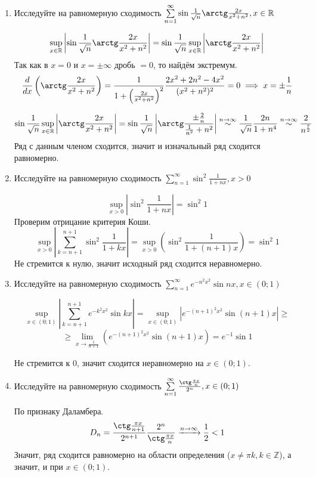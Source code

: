 \documentclass{article}
\begin{document}
\begin{large}
\begin{enumerate}
\item Исследуйте на равномерную сходимость $ \sum\limits_{n=1}^{\infty} \sin \frac{1}{\sqrt{n}} \arctg \frac{2x}{x^2 + n^2}, x \in \mathbb{R} $

$$ \sup_{x \in \mathbb{R}} \left| \sin \frac{1}{\sqrt{n}} \arctg \frac{2x}{x^2 + n^2} \right| = \sin \frac{1}{\sqrt{n}} \sup_{x \in \mathbb{R}} \left| \arctg \frac{2x}{x^2 + n^2} \right|  $$
Так как в $x = 0$ и $x = \pm\infty$ дробь $= 0$, то найдём экстремум. 
$$ \frac{d}{dx} \left( \arctg \frac{2x}{x^2+n^2} \right) = \frac{1}{1 + \left(\frac{2x}{x^2+n^2}\right)^2} \frac{2x^2 + 2n^2 - 4x^2}{(x^2+n^2)^2} = 0 \implies x = \pm\frac{1}{n} $$ 

$$ \sin \frac{1}{\sqrt{n}} \sup_{x \in \mathbb{R}} \left| \arctg \frac{2x}{x^2 + n^2} \right| = \sin \frac{1}{\sqrt{n}} \left| \arctg \frac{\pm\frac{2}{n}}{\frac{1}{n^2} + n^2} \right| \stackrel{n\to\infty}{\sim} 
\frac{1}{\sqrt{n}} \frac{2n}{1+n^4} \stackrel{n\to\infty}{\sim} \frac{2}{n^\frac{7}{2}} $$
Ряд с данным членом сходится, значит и изначальный ряд сходится равномерно.

\item Исследуйте на равномерную сходимость $ \sum\limits_{n=1}^{\infty} \sin^2 \frac{1}{1+nx}, x > 0 $

$$ \sup_{x>0} \left| \sin^2 \frac{1}{1+nx} \right| = \sin^2 1 $$
Проверим отрицание критерия Коши.
$$ \sup_{x>0} \left| \sum_{k=n+1}^{n+1} \sin^2 \frac{1}{1+kx} \right| = \sup_{x>0} \left( \sin^2 \frac{1}{1+(n+1)x} \right) = \sin^2 1 $$
Не стремится к нулю, значит исходный ряд сходится неравномерно. 

\item Исследуйте на равномерную сходимость $ \sum\limits_{n=1}^{\infty} e^{-n^2x^2} \sin nx, x\in(0;1) $

$$ \sup_{x \in (0;1)} \left| \sum_{k=n+1}^{n+1} e^{-k^2x^2} \sin kx \right|
= \sup_{x \in (0;1)} \left| e^{-(n+1)^2x^2} \sin (n+1)x \right| \geq $$
$$\geq \lim_{x\to\frac{1}{n+1}} \left( e^{-(n+1)^2x^2} \sin (n+1)x \right) = e^{-1} \sin 1 $$

Не стремится к $0$, значит сходится неравномерно на $x \in (0;1)$.

\item Исследуйте на равномерную сходимость $ \sum\limits_{n=1}^{\infty} \frac{\ctg \frac{\pi x}{n}}{2^n}, x \in (0;1) $

По признаку Даламбера.
$$ D_n =  \frac{\ctg \frac{\pi x}{n+1}}{2^{n+1}} \frac{2^n}{\ctg \frac{\pi x}{n}} \xrightarrow{n\to\infty} \frac{1}{2} < 1 $$
Значит, ряд сходится равномерно на области определения ($x \neq \pi k, k \in \mathbb{Z}$), а значит, и при $x \in (0;1)$.


\end{enumerate}
\end{large}
\end{document}
